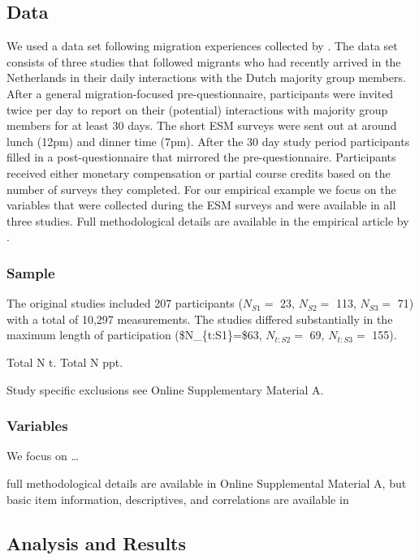 \subsection{Data}

We used a data set following migration experiences collected by
\citet[][]{Kreienkamp2022b}. The data set consists of three studies that
followed migrants who had recently arrived in the Netherlands in their
daily interactions with the Dutch majority group members. After a
general migration-focused pre-questionnaire, participants were invited
twice per day to report on their (potential) interactions with majority
group members for at least 30 days. The short ESM surveys were sent out
at around lunch (12pm) and dinner time (7pm). After the 30 day study
period participants filled in a post-questionnaire that mirrored the
pre-questionnaire. Participants received either monetary compensation or
partial course credits based on the number of surveys they completed.
For our empirical example we focus on the variables that were collected
during the ESM surveys and were available in all three studies. Full
methodological details are available in the empirical article by
\citet[][]{Kreienkamp2022b}.

\subsubsection{Sample}

The original studies included 207 participants (\(N_{S1}=\) 23,
\(N_{S2}=\) 113, \(N_{S3}=\) 71) with a total of 10,297 measurements.
The studies differed substantially in the maximum length of
participation (\$N\_\{t:S1\}=\$63, \(N_{t:S2}=\) 69, \(N_{t:S3}=\) 155).

\citep[proportion of missing data and imputations:][]{Madley-Dowd2019}

Total N t. Total N ppt.

Study specific exclusions see Online Supplementary Material A.

\subsubsection{Variables}

We focus on \ldots{}

full methodological details are available in Online Supplemental
Material A, but basic item information, descriptives, and correlations
are available in 

\subsection{Analysis and Results}

